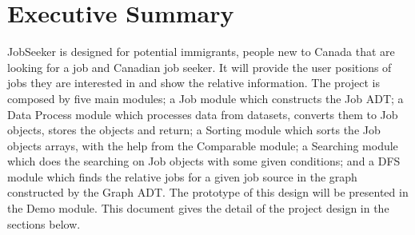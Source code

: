 \documentclass[12pt]{article}
\begin{document}
\newpage

\section*{Executive Summary}
JobSeeker is designed for potential immigrants, people new to Canada that are looking for a job and Canadian job seeker. It will provide the user positions of jobs they are interested in and show the relative information. The project is composed by five main modules; a Job module which constructs the Job ADT; a Data Process module which processes data from datasets, converts them to Job objects, stores the objects and return; a Sorting module which sorts the Job objects arrays, with the help from the Comparable module; a Searching module which does the searching on Job objects with some given conditions; and a DFS module which finds the relative jobs for a given job source in the graph constructed by the Graph ADT. The prototype of this design will be presented in the Demo module. This document gives the detail of the project design in the sections below.

\tableofcontents
\newpage
\end{document}
